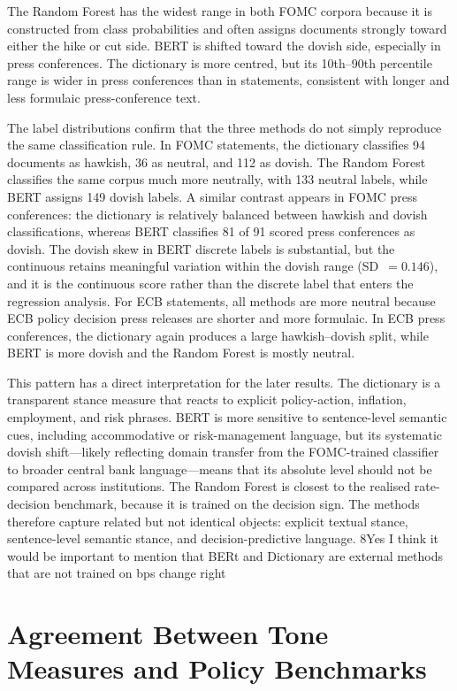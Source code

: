 The Random Forest has the widest range in both FOMC corpora because
it is constructed from class probabilities and often assigns documents strongly
toward either the hike or cut side. BERT is shifted toward the dovish
side, especially in press conferences. The dictionary is more centred, but its
10th--90th percentile range is wider in press conferences than in statements,
consistent with longer and less formulaic press-conference text.

The label distributions confirm that the three methods do not simply reproduce
the same classification rule. In FOMC statements, the dictionary classifies 94
documents as hawkish, 36 as neutral, and 112 as dovish. The Random Forest
classifies the same corpus much more neutrally, with 133 neutral labels, while
BERT assigns 149 dovish labels. A similar contrast appears in FOMC
press conferences: the dictionary is relatively balanced between hawkish and
dovish classifications, whereas BERT classifies 81 of 91 scored press
conferences as dovish. The dovish skew in BERT discrete labels is
substantial, but the continuous \bertscore{} retains meaningful variation
within the dovish range (SD~$=0.146$), and it is the continuous score rather
than the discrete label that enters the regression analysis. For ECB
statements, all methods are more neutral because ECB policy decision press
releases are shorter and more formulaic. In ECB press conferences, the
dictionary again produces a large hawkish--dovish split, while BERT is
more dovish and the Random Forest is mostly neutral.

This pattern has a direct interpretation for the later results. The dictionary
is a transparent stance measure that reacts to explicit policy-action,
inflation, employment, and risk phrases. BERT is more sensitive to
sentence-level semantic cues, including accommodative or risk-management
language, but its systematic dovish shift---likely reflecting domain transfer
from the FOMC-trained classifier to broader central bank language---means that
its absolute level should not be compared across institutions. The Random
Forest is closest to the realised rate-decision benchmark, because it is
trained on the decision sign. The methods therefore capture related but not
identical objects: explicit textual stance, sentence-level semantic stance, and
decision-predictive language. 8Yes I think it would be important to mention that BERt and Dictionary are external methods that are not trained on bps change right

\section{Agreement Between Tone Measures and Policy Benchmarks}
\label{sec:res_agreement_new}

